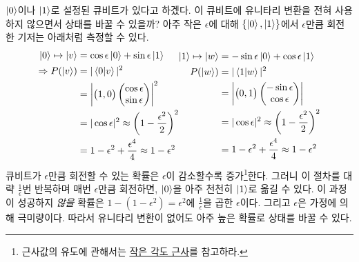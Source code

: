 \documentclass[a4paper,chapter,atbegshi]{oblivoir}
\begin{document}
$\ket0$이나 $\ket1$로 설정된 큐비트가 있다고 하겠다. 이 큐비트에 유니타리
변환을 전혀 사용하지 않으면서 상태를 바꿀 수 있을까? 아주 작은 $\epsilon$에 
대해 $\{\ket0,\ket1\}$에서 $\epsilon$만큼 회전한 기저는 아래처럼 측정할 수 있다.
\begin{align*}
  \begin{aligned}
  \ket0\mapsto\ket{v}&= \cos\epsilon\ket0+\sin\epsilon\ket1\\
  \Rightarrow 
    P(\ket{v})&=|\braket{0|v}|^2 \\
              &=\left|\begin{pmatrix}1,0\end{pmatrix}
              \begin{pmatrix}\cos\epsilon\\\sin\epsilon\end{pmatrix}\right|^2 \\
              &=|\cos\epsilon|^2 \approx{\biggl(1-\frac{\epsilon^2}{2}\biggr)^2}\\
              &= 1-\epsilon^2+\frac{\epsilon^4}{4}
              \approx 1-\epsilon^2 \\
  \end{aligned}
  \begin{aligned}
  \ket1\mapsto\ket{w}&=-\sin\epsilon\ket0+\cos\epsilon\ket1\\
    P(\ket w)&=|\braket{1|w}|^2 \\
              &=\left|\begin{pmatrix}0,1\end{pmatrix}
              \begin{pmatrix}-\sin\epsilon\\\cos\epsilon\end{pmatrix}\right|\\
              &=|\cos\epsilon|^2 \approx \biggl(1-\frac{\epsilon^2}{2}\biggr)^2\\
              &= 1-\epsilon^2+\frac{\epsilon^4}{4}
              \approx1-\epsilon^2
  \end{aligned}
\end{align*}
큐비트가 $\epsilon$만큼 회전할 수 있는 확률은 $\epsilon$이 감소할수록 
증가\footnote{근사값의 유도에 관해서는 \href{https://en.wikipedia.org/wiki/Small-angle_approximation}{작은 각도 근사}를 참고하라.}한다.
그러니 이 절차를 대략 $\frac{1}{\epsilon}$번 반복하며 매번 $\epsilon$만큼 
회전하면, $\ket0$을 아주 천천히 $\ket1$로 옮길 수 있다. 이 과정이
성공하지 \emph{않을} 확률은 $1-(1-\epsilon^2)=\epsilon^2$에 $\frac{1}{\epsilon}$을
곱한 $\epsilon$이다. 그리고 $\epsilon$은 가정에 의해 극미량이다.
따라서 유니타리 변환이 없어도 아주 높은 확률로 상태를 바꿀 수 있다. 
\end{document}
